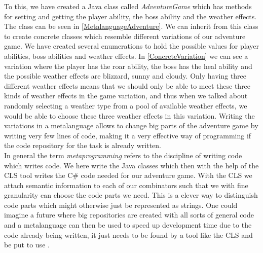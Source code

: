To this, we have created a Java class called \textit{AdventureGame} which has methods for setting and getting the player ability, the boss ability and the weather effects. The class can be seen in \autoref{MetalanguageAdventure}. We can inherit from this class to create concrete classes which resemble different variations of our adventure game. We have created several enumerations to hold the possible values for player abilities, boss abilities and weather effects. In \autoref{ConcreteVariation} we can see a variation where the player has the roar ability, the boss has the heal ability and the possible weather effects are blizzard, sunny and cloudy. Only having three different weather effects means that we should only be able to meet these three kinds of weather effects in the game variation, and thus when we talked about randomly selecting a weather type from a pool of available weather effects, we would be able to choose these three weather effects in this variation. Writing the variations in a metalanguage allows to change big parts of the adventure game by writing very few lines of code, making it a very effective way of programming if the code repository for the task is already written.\\
In general the term \textit{metaprogramming} refers to the discipline of writing code which writes code. We here write the Java classes which then with the help of the CLS tool writes the C\# code needed for our adventure game. With the CLS we attach semantic information to each of our combinators such that we with fine granularity can choose the code parts we need. This is a clever way to distinguish code parts which might otherwise just be represented as strings. One could imagine a future where big repositories are created with all sorts of general code and a metalanguage can then be used to speed up development time due to the code already being written, it just needs to be found by a tool like the CLS and be put to use . 
